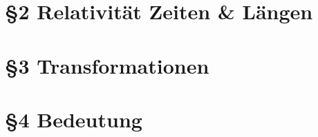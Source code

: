 \documentclass[]{beamer}%
\begin{document}
\section{§2 Relativität Zeiten \& Längen}
\begin{frame}
\end{frame}

\section{§3 Transformationen}
\begin{frame}
\end{frame}

\section{§4 Bedeutung}
\begin{frame}
\end{frame}
\end{document}
